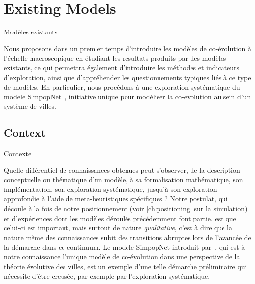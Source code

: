 




\newpage


\section[Existing Models][Modèles existants]{Existing Models}{Modèles existants}

\label{sec:macrocoevolexplo}



Nous proposons dans un premier temps d'introduire les modèles de co-évolution à l'échelle macroscopique en étudiant les résultats produits par des modèles existants, ce qui permettra également d'introduire les méthodes et indicateurs d'exploration, ainsi que d'appréhender les questionnements typiques liés à ce type de modèles. En particulier, nous procédons à une exploration systématique du modele SimpopNet~\cite{schmitt2014modelisation}, initiative unique pour modéliser la co-evolution au sein d'un système de villes.



\subsection{Context}{Contexte}

Quelle différentiel de connaissances obtenues peut s'observer, de la description conceptuelle ou thématique d'un modèle, à sa formalisation mathématique, son implémentation, son exploration systématique, jusqu'à son exploration approfondie à l'aide de meta-heuristiques spécifiques ? Notre postulat, qui découle à la fois de notre positionnement (voir \autoref{ch:positioning} sur la simulation) et d'expériences dont les modèles déroulés précédemment font partie, est que celui-ci est important, mais surtout de nature \emph{qualitative}, c'est à dire que la nature même des connaissances subit des transitions abruptes lors de l'avancée de la démarche dans ce continuum. Le modèle SimpopNet introduit par~\cite{schmitt2014modelisation}, qui est à notre connaissance l'unique modèle de co-évolution dans une perspective de la théorie évolutive des villes, est un exemple d'une telle démarche préliminaire qui nécessite d'être creusée, par exemple par l'exploration systématique.


